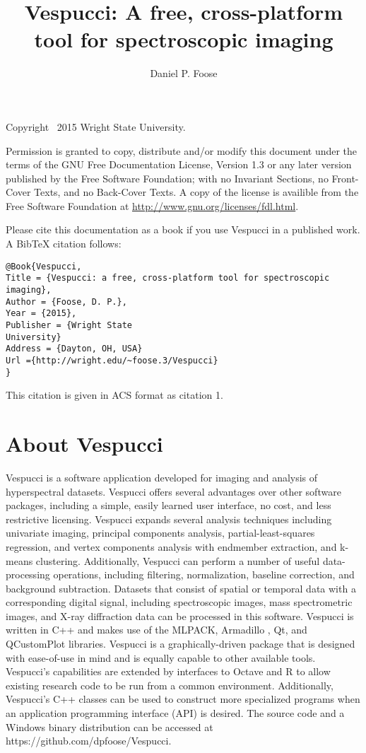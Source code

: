\documentclass[12pt]{achemso} %
\title{Vespucci: A free, cross-platform tool for spectroscopic imaging}
\author{Daniel P. Foose} \affiliation{Wright State University}
\begin{document}
 
\maketitle
\newpage \begin{center} Copyright \textcopyright \ 2015 Wright State University.
\end{center}

Permission is granted to copy, distribute and/or modify this document under the
terms of the GNU Free Documentation License, Version 1.3 or any later version
published by the Free Software Foundation; with no Invariant Sections, no
Front-Cover Texts, and no Back-Cover Texts. A copy of the license is availible
from the Free Software Foundation at \url{http://www.gnu.org/licenses/fdl.html}.

Please cite this documentation as a book if you use Vespucci in a published
work. A BibTeX citation follows: \cite{Vespucci} \begin{verbatim}
@Book{Vespucci, 
Title = {Vespucci: a free, cross-platform tool for spectroscopic
imaging}, 
Author = {Foose, D. P.}, 
Year = {2015}, 
Publisher = {Wright State
University} 
Address = {Dayton, OH, USA} 
Url ={http://wright.edu/~foose.3/Vespucci} 
} 
\end{verbatim} 
This citation is given in
ACS format as citation 1. \newpage \tableofcontents


\newpage \section{About Vespucci} Vespucci is a software application developed
for imaging and analysis of hyperspectral datasets. Vespucci offers several
advantages over other software packages, including a simple, easily learned user
interface, no cost, and less restrictive licensing. Vespucci expands several
analysis techniques including univariate imaging, principal components analysis,
partial-least-squares regression, and vertex components analysis with endmember
extraction, and k-means clustering. Additionally, Vespucci can perform a number
of useful data-processing operations, including filtering, normalization,
baseline correction, and background subtraction. Datasets that consist of
spatial or temporal data with a corresponding digital signal, including
spectroscopic images, mass spectrometric images, and X-ray diffraction data can
be processed in this software. Vespucci is written in C++ and makes use of the
MLPACK, Armadillo , Qt, and QCustomPlot libraries. Vespucci is a
graphically-driven package that is designed with ease-of-use in mind and is
equally capable to other available tools. Vespucci’s capabilities are extended
by interfaces to Octave and R to allow existing research code to be run from a
common environment. Additionally, Vespucci’s C++ classes can be used to
construct more specialized programs when an application programming interface
(API) is desired. The source code and a Windows binary distribution can be
accessed at https://github.com/dpfoose/Vespucci.
\end{document}
